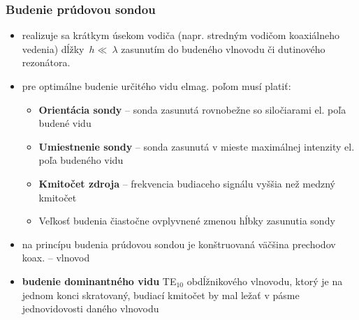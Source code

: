 	\subsubsection{Budenie prúdovou sondou}
	\begin{itemize}[label=--]
		\item realizuje sa krátkym úsekom vodiča (napr. stredným vodičom koaxiálneho vedenia) dĺžky~$h\ll~\lambda$ zasunutím do budeného vlnovodu či dutinového rezonátora. 
		\item pre optimálne budenie určitého vidu elmag. poľom musí platiť:
		\begin{itemize}[label=$\rightarrow$]
			\item \textbf{Orientácia sondy} -- sonda zasunutá rovnobežne so siločiarami el. poľa budené vidu
			\item \textbf{Umiestnenie sondy} -- sonda zasunutá v mieste maximálnej intenzity el. poľa budeného vidu
			\item \textbf{Kmitočet zdroja} -- frekvencia budiaceho signálu vyššia než medzný kmitočet
			\item Veľkosť budenia čiastočne ovplyvnené zmenou hĺbky zasunutia sondy
		\end{itemize}
		\item na princípu budenia prúdovou sondou je konštruovaná väčšina prechodov koax. -- vlnovod
		\item \textbf{budenie dominantného vidu} TE$_{10}$ obdĺžnikového vlnovodu, ktorý je na jednom konci skratovaný, budiací kmitočet by mal ležať v pásme jednovidovosti daného vlnovodu
		\end{itemize}
	
